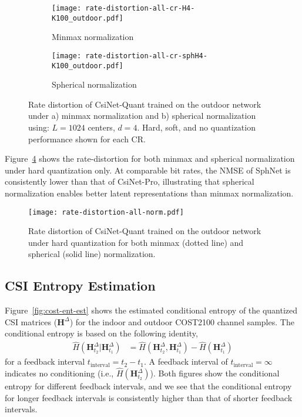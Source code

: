 \begin{figure}[htb] \centering 
	\begin{subfigure}[t]{.48\textwidth}
		\texttt{[image: rate-distortion-all-cr-H4-K100\_outdoor.pdf]}
		\caption{Minmax normalization} 
		\label{fig:rate-distortion-minmax} 
	\end{subfigure}
	\begin{subfigure}[t]{.48\textwidth}
		\texttt{[image: rate-distortion-all-cr-sphH4-K100\_outdoor.pdf]}
		\caption{Spherical normalization} 
		\label{fig:rate-distortion-sph} 
	\end{subfigure}
	\caption{Rate distortion of CsiNet-Quant trained on the outdoor network under a) minmax normalization and b) spherical normalization using: $L=1024$ centers, $d=4$. Hard, soft, and no quantization performance shown for each CR.} 
  	\label{fig:rate-distortion-softquant} 
\end{figure}

Figure~\ref{fig:rate-distortion-norms} shows the rate-distortion for both minmax and spherical normalization under hard quantization only. At comparable bit rates, the NMSE of SphNet is consistently lower than that of CsiNet-Pro, illustrating that spherical normalization enables better latent representations than minmax normalization.

\begin{figure}[htb] \centering 
  \texttt{[image: rate-distortion-all-norm.pdf]}
  \caption{Rate distortion of CsiNet-Quant trained on the outdoor network under hard quantization for both minmax (dotted line) and spherical (solid line) normalization.} 
  \label{fig:rate-distortion-norms} 
\end{figure}

\subsection{CSI Entropy Estimation} \label{sec:results-ent-estimation}

Figure~\ref{fig:cost-ent-est} shows the estimated conditional entropy of the quantized CSI matrices ($\mathbf H^{\Delta}$) for the indoor and outdoor COST2100 channel samples. The conditional entropy is based on the following identity,
\begin{align*}
	\hat H(\mathbf H^\Delta_{t_2} | \mathbf H^\Delta_{t_1}) &= \hat H(\mathbf H^\Delta_{t_2}, \mathbf H^\Delta_{t_1}) - \hat H(\mathbf H^\Delta_{t_1})
\end{align*}
for a feedback interval $t_{\text{interval}} = t_2 - t_1$. A feedback interval of $t_{\text{interval}} = \infty$ indicates no conditioning (i.e., $\hat H(\mathbf H^\Delta_{t_2})$). Both figures show the conditional entropy for different feedback intervals, and we see that the conditional entropy for longer feedback intervals is consistently higher than that of shorter feedback intervals. 

